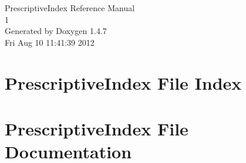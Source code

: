 \documentclass[a4paper]{book}
\begin{document}
\begin{titlepage}
\vspace*{7cm}
\begin{center}
{\Large Prescriptive\-Index Reference Manual\\[1ex]\large 1 }\\
\vspace*{1cm}
{\large Generated by Doxygen 1.4.7}\\
\vspace*{0.5cm}
{\small Fri Aug 10 11:41:39 2012}\\
\end{center}
\end{titlepage}
\clearemptydoublepage
{}
\tableofcontents
\clearemptydoublepage
{}
\chapter{Prescriptive\-Index File Index}

\chapter{Prescriptive\-Index File Documentation}

\printindex
\end{document}
